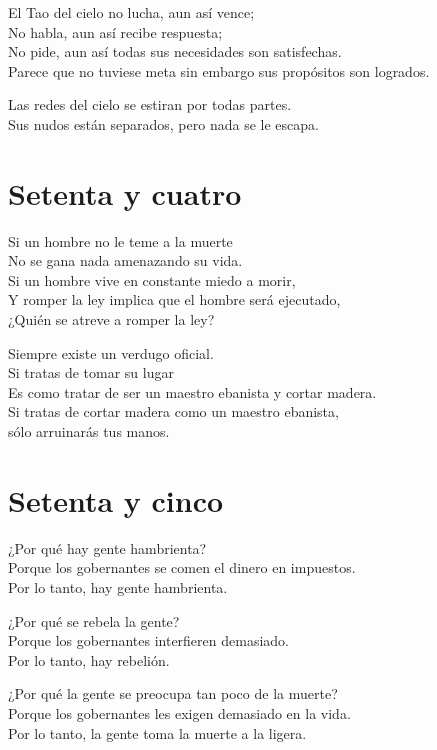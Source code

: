 \documentclass[book,b5paper,hidelinks,final]{memoir}
\begin{document}
	El Tao del cielo no lucha, aun así vence;\\
	No habla, aun así recibe respuesta;\\
	No pide, aun así todas sus necesidades son satisfechas.\\
	Parece que no tuviese meta sin embargo sus propósitos son logrados.
	
	Las redes del cielo se estiran por todas partes.\\
	Sus nudos están separados, pero nada se le escapa.
	
	\chapter*{Setenta y cuatro}
	
	Si un hombre no le teme a la muerte\\
	No se gana nada amenazando su vida.\\
	Si un hombre vive en constante miedo a morir,\\
	Y romper la ley implica que el hombre será ejecutado,\\
	¿Quién se atreve a romper la ley?
	
	Siempre existe un verdugo oficial.\\
	Si tratas de tomar su lugar\\
	Es como tratar de ser un maestro ebanista y cortar madera.\\
	Si tratas de cortar madera como un maestro ebanista,\\
	sólo arruinarás tus manos.
	
	\chapter*{Setenta y cinco}
	
	¿Por qué hay gente hambrienta?\\
	Porque los gobernantes se comen el dinero en impuestos.\\
	Por lo tanto, hay gente hambrienta.
	
	¿Por qué se rebela la gente?\\
	Porque los gobernantes interfieren demasiado.\\
	Por lo tanto, hay rebelión.
	
	¿Por qué la gente se preocupa tan poco de la muerte?\\
	Porque los gobernantes les exigen demasiado en la vida.\\
	Por lo tanto, la gente toma la muerte a la ligera.
	
\end{document}

